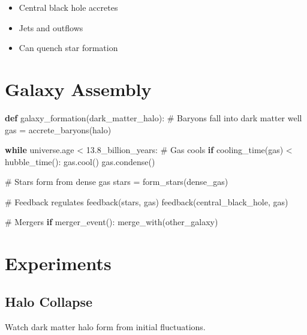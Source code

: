 \documentclass[
  11pt,
  letterpaper,
  twoside,
  openright]{book}
\newenvironment{Shaded}{\begin{snugshade}}{\end{snugshade}}
\newcommand{\CommentTok}[1]{\textcolor[rgb]{0.37,0.37,0.37}{#1}}
\newcommand{\ControlFlowTok}[1]{\textcolor[rgb]{0.00,0.23,0.31}{\textbf{#1}}}
\newcommand{\ErrorTok}[1]{\textcolor[rgb]{0.68,0.00,0.00}{#1}}
\newcommand{\FloatTok}[1]{\textcolor[rgb]{0.68,0.00,0.00}{#1}}
\newcommand{\KeywordTok}[1]{\textcolor[rgb]{0.00,0.23,0.31}{\textbf{#1}}}
\newcommand{\NormalTok}[1]{\textcolor[rgb]{0.00,0.23,0.31}{#1}}
\newcommand{\OperatorTok}[1]{\textcolor[rgb]{0.37,0.37,0.37}{#1}}
\providecommand{\tightlist}{%
  \setlength{\itemsep}{0pt}\setlength{\parskip}{0pt}}
\begin{document}
\begin{itemize}
\tightlist
\item
  Central black hole accretes
\item
  Jets and outflows
\item
  Can quench star formation
\end{itemize}

\section{Galaxy Assembly}\label{galaxy-assembly}

\begin{Shaded}
\begin{Highlighting}[]
\KeywordTok{def}\NormalTok{ galaxy\_formation(dark\_matter\_halo):}
    \CommentTok{\# Baryons fall into dark matter well}
\NormalTok{    gas }\OperatorTok{=}\NormalTok{ accrete\_baryons(halo)}

    \ControlFlowTok{while}\NormalTok{ universe.age }\OperatorTok{\textless{}} \FloatTok{13.8}\ErrorTok{\_billion\_years}\NormalTok{:}
        \CommentTok{\# Gas cools}
        \ControlFlowTok{if}\NormalTok{ cooling\_time(gas) }\OperatorTok{\textless{}}\NormalTok{ hubble\_time():}
\NormalTok{            gas.cool()}
\NormalTok{            gas.condense()}

        \CommentTok{\# Stars form from dense gas}
\NormalTok{        stars }\OperatorTok{=}\NormalTok{ form\_stars(dense\_gas)}

        \CommentTok{\# Feedback regulates}
\NormalTok{        feedback(stars, gas)}
\NormalTok{        feedback(central\_black\_hole, gas)}

        \CommentTok{\# Mergers}
        \ControlFlowTok{if}\NormalTok{ merger\_event():}
\NormalTok{            merge\_with(other\_galaxy)}
\end{Highlighting}
\end{Shaded}

\section{Experiments}\label{experiments-24}

\subsection{Halo Collapse}\label{halo-collapse}

Watch dark matter halo form from initial fluctuations.
\end{document}
